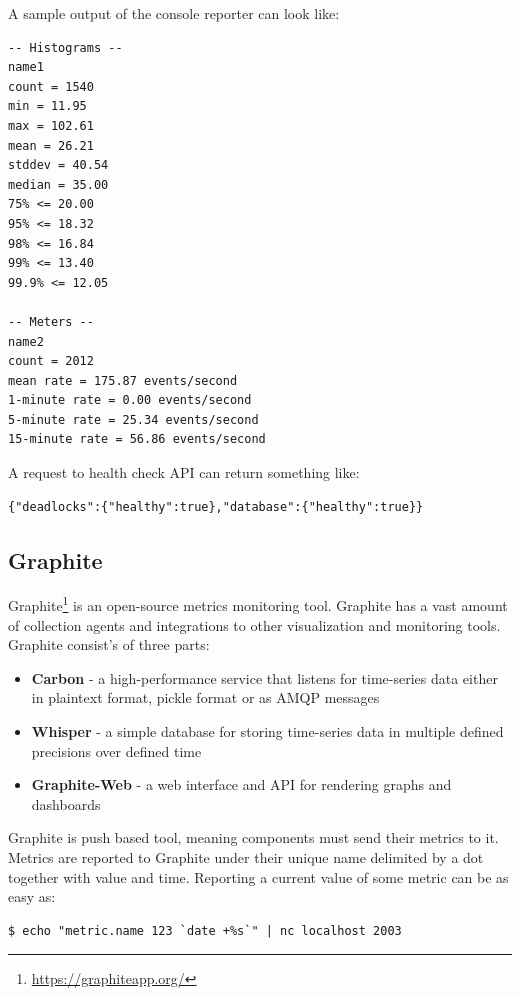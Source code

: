 \documentclass[12pt,oneside]{fithesis2}
\begin{document}
A sample output of the console reporter can look like:
\begin{lstlisting}[caption = Metrics console reporter output, label = spanmanager, style=eclipse_java]
-- Histograms --
name1
count = 1540
min = 11.95
max = 102.61
mean = 26.21
stddev = 40.54
median = 35.00
75% <= 20.00
95% <= 18.32
98% <= 16.84
99% <= 13.40
99.9% <= 12.05
 
-- Meters --
name2
count = 2012
mean rate = 175.87 events/second
1-minute rate = 0.00 events/second
5-minute rate = 25.34 events/second
15-minute rate = 56.86 events/second
\end{lstlisting}
\newpage
A request to health check API can return something like:\newline

\begin{verbatim}
{"deadlocks":{"healthy":true},"database":{"healthy":true}}
\end{verbatim}

\subsection{Graphite}

Graphite\footnote{\url{https://graphiteapp.org/}} is an open-source metrics monitoring tool. Graphite has a vast amount of collection agents and integrations to other visualization and monitoring tools. Graphite consist's of three parts:

\begin{itemize}
\item \textbf{Carbon} - a high-performance service that listens for time-series data either in plaintext format, pickle format or as AMQP messages
\item \textbf{Whisper} - a simple database for storing time-series data in multiple defined precisions over defined time
\item \textbf{Graphite-Web} - a web interface and API for rendering graphs and dashboards
\end{itemize}

Graphite is push based tool, meaning components must send their metrics to it. Metrics are reported to Graphite under their unique name delimited by a dot together with value and time. Reporting a current value of some metric can be as easy as:\newline

\begin{verbatim}
$ echo "metric.name 123 `date +%s`" | nc localhost 2003
\end{verbatim}
\end{document}

